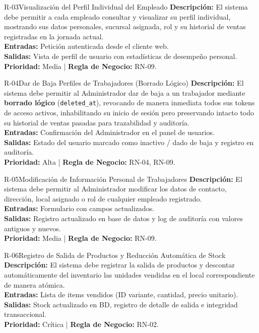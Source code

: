 \begin{reqbox}{R-03}{Visualización del Perfil Individual del Empleado}
\textbf{Descripción:} El sistema debe permitir a cada empleado consultar y visualizar su perfil individual, mostrando sus datos personales, sucursal asignada, rol y su historial de ventas registradas en la jornada actual.\\
\textbf{Entradas:} Petición autenticada desde el cliente web.\\
\textbf{Salidas:} Vista de perfil de usuario con estadísticas de desempeño personal.\\
\textbf{Prioridad:} Media | \textbf{Regla de Negocio:} RN-09.
\end{reqbox}

\begin{reqbox}{R-04}{Dar de Baja Perfiles de Trabajadores (Borrado Lógico)}
\textbf{Descripción:} El sistema debe permitir al Administrador dar de baja a un trabajador mediante \textbf{borrado lógico} (\texttt{deleted\_at}), revocando de manera inmediata todos sus tokens de acceso activos, inhabilitando su inicio de sesión pero preservando intacto todo su historial de ventas pasadas para trazabilidad y auditoría.\\
\textbf{Entradas:} Confirmación del Administrador en el panel de usuarios.\\
\textbf{Salidas:} Estado del usuario marcado como inactivo / dado de baja y registro en auditoría.\\
\textbf{Prioridad:} Alta | \textbf{Regla de Negocio:} RN-04, RN-09.
\end{reqbox}

\begin{reqbox}{R-05}{Modificación de Información Personal de Trabajadores}
\textbf{Descripción:} El sistema debe permitir al Administrador modificar los datos de contacto, dirección, local asignado o rol de cualquier empleado registrado.\\
\textbf{Entradas:} Formulario con campos actualizados.\\
\textbf{Salidas:} Registro actualizado en base de datos y log de auditoría con valores antiguos y nuevos.\\
\textbf{Prioridad:} Media | \textbf{Regla de Negocio:} RN-09.
\end{reqbox}

\begin{reqbox}{R-06}{Registro de Salida de Productos y Reducción Automática de Stock}
\textbf{Descripción:} El sistema debe registrar la salida de productos y descontar automáticamente del inventario las unidades vendidas en el local correspondiente de manera atómica.\\
\textbf{Entradas:} Lista de items vendidos (ID variante, cantidad, precio unitario).\\
\textbf{Salidas:} Stock actualizado en BD, registro de detalle de salida e integridad transaccional.\\
\textbf{Prioridad:} Crítica | \textbf{Regla de Negocio:} RN-02.
\end{reqbox}

